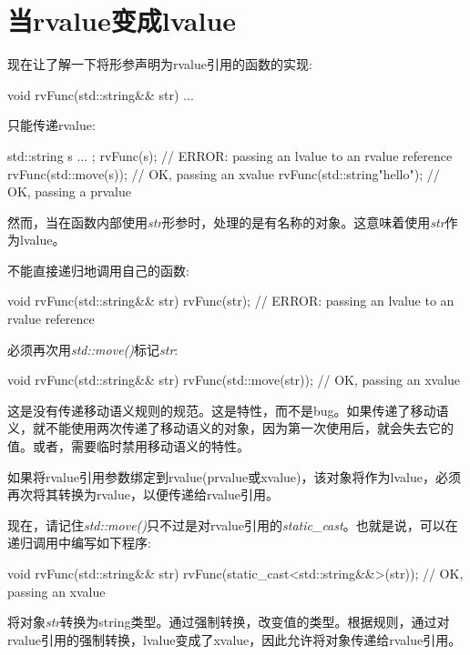 \section{当rvalue变成lvalue}
现在让了解一下将形参声明为rvalue引用的函数的实现:

\begin{cppcode}
void rvFunc(std::string&& str) {
	...
}
\end{cppcode}

只能传递rvalue:

\begin{cppcode}
std::string s{ ... };
rvFunc(s); // ERROR: passing an lvalue to an rvalue reference
rvFunc(std::move(s)); // OK, passing an xvalue
rvFunc(std::string{"hello"}); // OK, passing a prvalue
\end{cppcode}

然而，当在函数内部使用\textit{str}形参时，处理的是有名称的对象。这意味着使用\textit{str}作为lvalue。

不能直接递归地调用自己的函数:

\begin{cppcode}
void rvFunc(std::string&& str) {
	rvFunc(str); // ERROR: passing an lvalue to an rvalue reference
}
\end{cppcode}

必须再次用\textit{std::move()}标记\textit{str}:

\begin{cppcode}
void rvFunc(std::string&& str) {
	rvFunc(std::move(str)); // OK, passing an xvalue
}
\end{cppcode}

这是没有传递移动语义规则的规范。这是特性，而不是bug。如果传递了移动语义，就不能使用两次传递了移动语义的对象，因为第一次使用后，就会失去它的值。或者，需要临时禁用移动语义的特性。

如果将rvalue引用参数绑定到rvalue(prvalue或xvalue)，该对象将作为lvalue，必须再次将其转换为rvalue，以便传递给rvalue引用。

现在，请记住\textit{std::move()}只不过是对rvalue引用的\textit{static_cast}。也就是说，可以在递归调用中编写如下程序:

\begin{cppcode}
void rvFunc(std::string&& str) {
	rvFunc(static_cast<std::string&&>(str)); // OK, passing an xvalue
}
\end{cppcode}

将对象\textit{str}转换为string类型。通过强制转换，改变值的类型。根据规则，通过对rvalue引用的强制转换，lvalue变成了xvalue，因此允许将对象传递给rvalue引用。

